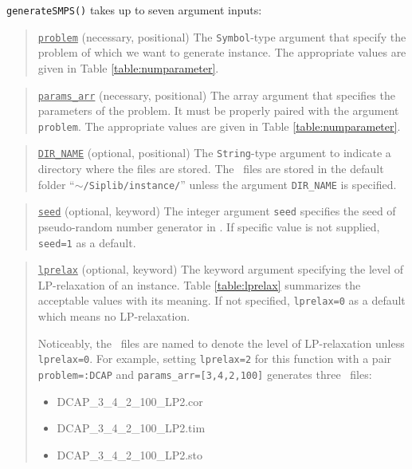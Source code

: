 \texttt{generateSMPS()} takes up to seven argument inputs:
\begin{quote}
	\noindent\underline{\texttt{problem}} (necessary, positional) The \texttt{Symbol}-type argument that specify the problem of which we want to generate instance. The appropriate values are given in Table \ref{table:numparameter}. 
\end{quote}

\begin{quote}
	\noindent\underline{\texttt{params\_arr}} (necessary, positional) The array argument that specifies the parameters of the problem. It must be properly paired with the argument \texttt{problem}. The appropriate values are given in Table \ref{table:numparameter}. 
\end{quote}

\begin{quote}
	\noindent\underline{\texttt{DIR\_NAME}} (optional, positional) The \texttt{String}-type argument to indicate a directory where the files are stored. The \smps\ files are stored in the default folder ``\texttt{$\sim$/Siplib/instance/}'' unless the argument \texttt{DIR\_NAME} is specified.
\end{quote}

\begin{quote}
	\noindent\underline{\texttt{seed}} (optional, keyword) The integer argument \texttt{seed} specifies the seed of pseudo-random number generator in \julia. If specific value is not supplied, \texttt{seed=1} as a default.
\end{quote}

\begin{quote}
	\noindent\underline{\texttt{lprelax}} (optional, keyword) The keyword argument specifying the level of LP-relaxation of an instance. Table \ref{table:lprelax} summarizes the acceptable values with its meaning. If not specified, \texttt{lprelax=0} as a default which means no LP-relaxation.
	
	Noticeably, the \smps\ files are named to denote the level of LP-relaxation unless \texttt{lprelax=0}. For example, setting \texttt{lprelax=2} for this function with a pair \texttt{problem=:DCAP} and \texttt{params\_arr=[3,4,2,100]} generates three \smps\ files: 
	\begin{itemize}
		\item DCAP\_3\_4\_2\_100\_LP2.cor
		\item DCAP\_3\_4\_2\_100\_LP2.tim
		\item DCAP\_3\_4\_2\_100\_LP2.sto
	\end{itemize}
\end{quote}

